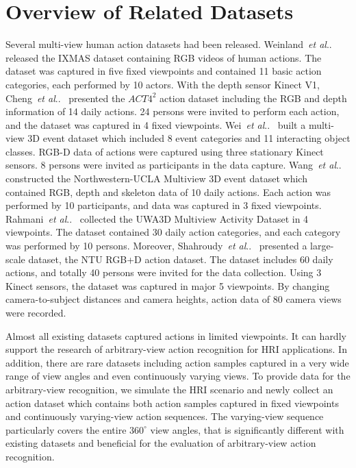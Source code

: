 \documentclass[journal]{IEEEtran}
\makeatletter
\DeclareRobustCommand\onedot{\futurelet\@let@token\@onedot}
\def\@onedot{\ifx\@let@token.\else.\null\fi\xspace}
\def\etal{\emph{et al}\onedot}
\makeatother
\begin{document}
\section{Overview of Related Datasets}
\label{sec:OverviewDatabase}
Several multi-view human action datasets had been released. Weinland~\etal~\cite{IXMAS2006} released the IXMAS dataset containing RGB videos of human actions. The dataset was captured in five fixed viewpoints and contained 11 basic action categories, each performed by 10 actors. With the depth sensor Kinect V1, Cheng~\etal~\cite{ChengACT42012} presented the $ACT4^2$ action dataset including the RGB and depth information of 14 daily actions. 24 persons were invited to perform each action, and the dataset was captured in 4 fixed viewpoints. Wei~\etal~\cite{Wei4DHOI2013} built a multi-view 3D event dataset which included 8 event categories and 11 interacting object classes. RGB-D data of actions were captured using three stationary Kinect sensors. 8 persons were invited as participants in the data capture. Wang~\etal~\cite{WangMSTAOG2014} constructed the Northwestern-UCLA Multiview 3D event dataset which contained RGB, depth and skeleton data of 10 daily actions. Each action was performed by 10 participants, and data was captured in 3 fixed viewpoints. Rahmani~\etal~\cite{RahmaniHOPC2014} collected the UWA3D Multiview Activity Dataset in 4 viewpoints. The dataset contained 30 daily action categories, and each category was performed by 10 persons. Moreover, Shahroudy~\etal~\cite{ShahroudyNTU2016} presented a large-scale dataset, the NTU RGB+D action dataset. The dataset includes 60 daily actions, and totally 40 persons were invited for the data collection. Using 3 Kinect sensors, the dataset was captured in major 5 viewpoints. By changing camera-to-subject distances and camera heights, action data of 80 camera views were recorded.

Almost all existing datasets captured actions in limited viewpoints. It can hardly support the research of arbitrary-view action recognition for HRI applications. In addition, there are rare datasets including action samples captured in a very wide range of view angles and even continuously varying views.
To provide data for the arbitrary-view recognition, we simulate the HRI scenario and newly collect an action dataset which contains both action samples captured in fixed viewpoints and continuously varying-view action sequences. The varying-view sequence particularly covers the entire $360^\circ$ view angles, that is significantly different with existing datasets and beneficial for the evaluation of arbitrary-view action recognition.
\end{document}
